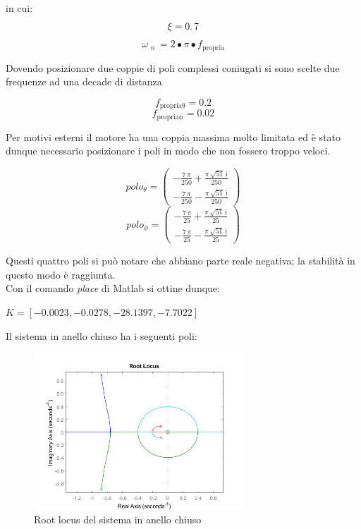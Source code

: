 \begin{center}
	in cui:
	$$
	\xi =0\ldotp 7
	$$
	$$
	\omega {\;}_{n\;} =2\bullet \pi \bullet f_{\mathrm{propria}}
	$$
\end{center}Dovendo posizionare due coppie di poli complessi coniugati si sono scelte due frequenze ad una decade di distanza
\begin{center}
	
	$$
	f_{\mathrm{propria\theta}} =  0.2
	$$
	$$
	f_{\mathrm{propria\phi}} =  0.02
	$$
\end{center}Per motivi esterni il motore ha una coppia massima molto limitata ed è stato dunque necessario posizionare i poli in modo che non fossero troppo veloci.
\begin{center}
	
	$$
	polo_{\theta} = \left(\begin{array}{c}
	-\frac{7\,\pi }{250}+\frac{\pi \,\sqrt{51}\,\mathrm{i}}{250}\\
	-\frac{7\,\pi }{250}-\frac{\pi \,\sqrt{51}\,\mathrm{i}}{250}
	\end{array}\right)
	$$
	$$
	polo_{\phi} = \left(\begin{array}{c}
	-\frac{7\,\pi }{25}+\frac{\pi \,\sqrt{51}\,\mathrm{i}}{25}\\
	-\frac{7\,\pi }{25}-\frac{\pi \,\sqrt{51}\,\mathrm{i}}{25}
	\end{array}\right)
	$$
\end{center}	Questi quattro poli si può notare che abbiano parte reale negativa; la stabilità in questo modo è raggiunta.\\
Con il comando \textit{place} di Matlab si ottine dunque:
\begin{center}

	$	K =[  -0.0023  , -0.0278, -28.1397  , -7.7022]$

\end{center}
Il sistema in anello chiuso ha i seguenti poli:
\begin{figure}[H]
	\centering   	
	\includegraphics[width=0.70\textwidth]{Immagini/root_locus_closed_loop.png}
	\caption{Root locus del sistema in anello chiuso}
	\label{fig:closed_loop_root}
\end{figure}

